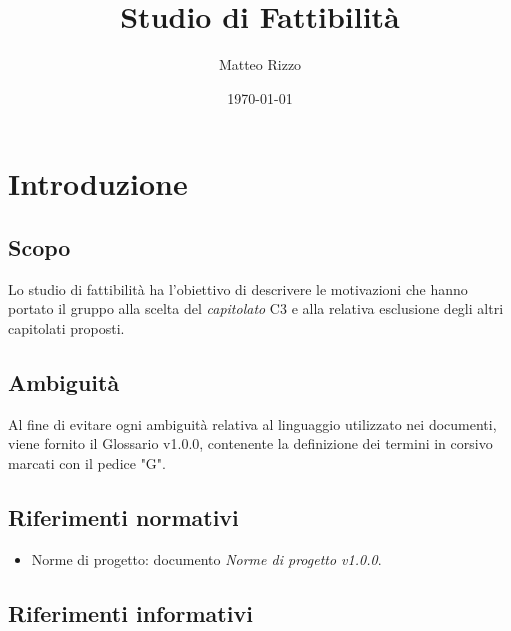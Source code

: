 \documentclass[openany,12pt,a4paper]{report}
\title{Studio di Fattibilità}
\author{Matteo Rizzo}
\date{\today}
\begin{document}
\maketitle

 
\tableofcontents{}


\chapter{Introduzione}

\section{Scopo}

Lo studio di fattibilità ha l’obiettivo di descrivere le motivazioni che hanno portato
il gruppo alla scelta del  \textit{capitolato} C3 e alla relativa esclusione degli altri
capitolati proposti.

\section{Ambiguità}

Al fine di evitare ogni ambiguità relativa al linguaggio utilizzato nei documenti, viene
fornito il Glossario v1.0.0, contenente la definizione dei termini in corsivo marcati con
il pedice "G".

\section{Riferimenti normativi}

\begin{itemize}

    \item{Norme di progetto:} documento \textit{Norme di progetto v1.0.0}.

\end{itemize}

\section{Riferimenti informativi}
\end{document}

